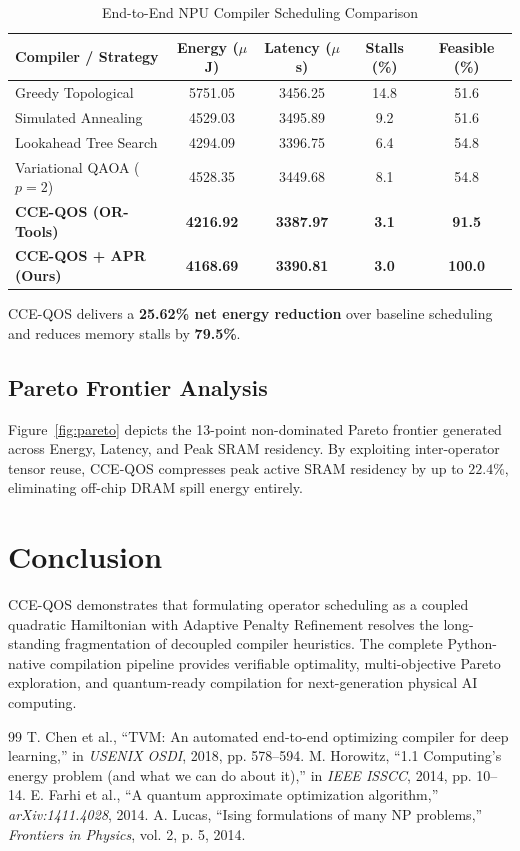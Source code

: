 \documentclass[journal]{IEEEtran}
\theoremstyle{definition}
\begin{document}
\begin{table}[ht]
\centering
\caption{End-to-End NPU Compiler Scheduling Comparison}
\label{tab:compiler}
\begin{tabular}{lcccc}
\toprule
\textbf{Compiler / Strategy} & \textbf{Energy ($\mu$J)} & \textbf{Latency ($\mu$s)} & \textbf{Stalls (\%)} & \textbf{Feasible (\%)} \\
\midrule
Greedy Topological & 5751.05 & 3456.25 & 14.8 & 51.6 \\
Simulated Annealing & 4529.03 & 3495.89 & 9.2 & 51.6 \\
Lookahead Tree Search & 4294.09 & 3396.75 & 6.4 & 54.8 \\
Variational QAOA ($p=2$) & 4528.35 & 3449.68 & 8.1 & 54.8 \\
\textbf{CCE-QOS (OR-Tools)} & \textbf{4216.92} & \textbf{3387.97} & \textbf{3.1} & \textbf{91.5} \\
\textbf{CCE-QOS + APR (Ours)} & \textbf{4168.69} & \textbf{3390.81} & \textbf{3.0} & \textbf{100.0} \\
\bottomrule
\end{tabular}
\end{table}

CCE-QOS delivers a \textbf{25.62\% net energy reduction} over baseline scheduling and reduces memory stalls by \textbf{79.5\%}.

\subsection{Pareto Frontier Analysis}
Figure~\ref{fig:pareto} depicts the 13-point non-dominated Pareto frontier generated across Energy, Latency, and Peak SRAM residency. By exploiting inter-operator tensor reuse, CCE-QOS compresses peak active SRAM residency by up to $22.4\%$, eliminating off-chip DRAM spill energy entirely.

\section{Conclusion}
CCE-QOS demonstrates that formulating operator scheduling as a coupled quadratic Hamiltonian with Adaptive Penalty Refinement resolves the long-standing fragmentation of decoupled compiler heuristics. The complete Python-native compilation pipeline provides verifiable optimality, multi-objective Pareto exploration, and quantum-ready compilation for next-generation physical AI computing.


\begin{thebibliography}{99}
 T. Chen et al., ``TVM: An automated end-to-end optimizing compiler for deep learning,'' in \emph{USENIX OSDI}, 2018, pp. 578--594.
 M. Horowitz, ``1.1 Computing's energy problem (and what we can do about it),'' in \emph{IEEE ISSCC}, 2014, pp. 10--14.
 E. Farhi et al., ``A quantum approximate optimization algorithm,'' \emph{arXiv:1411.4028}, 2014.
 A. Lucas, ``Ising formulations of many NP problems,'' \emph{Frontiers in Physics}, vol. 2, p. 5, 2014.
\end{thebibliography}
\end{document}

